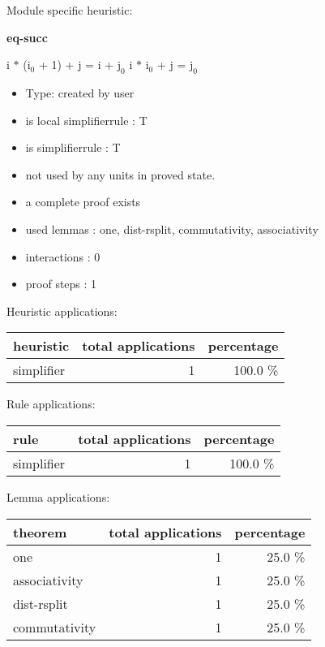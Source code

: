 \documentclass[a4paper]{article}
\begin{document}
Module specific heuristic:

\pagebreak

{\LARGE\bf eq-succ}\label{lemma-eq-succ}

\medskip

 \Fol i $*$ ($\mbox{i}_{0}$ + 1) + j = i + $\mbox{j}_{0}$ \Equiv i $*$ $\mbox{i}_{0}$ + j = $\mbox{j}_{0}$

\begin{itemize}

\item Type: created by user

\item is local simplifierrule : T
\item is simplifierrule : T
\item not used by any units in proved state.
\item       a complete proof exists
\item       used lemmas  : one, dist-rsplit, commutativity, associativity
\item       interactions : 0
\item       proof steps  : 1
\end{itemize}

\medskip


Heuristic applications:

\begin{supertabular}{l|r|r}
heuristic	& total applications & percentage \\ \hline
simplifier & 1 & 100.0 \% \\

\end{supertabular}

Rule applications:

\begin{supertabular}{l|r|r}
rule	        & total applications & percentage \\ \hline
simplifier & 1 & 100.0 \% \\

\end{supertabular}

Lemma applications:

\begin{supertabular}{l|r|r}
theorem	        & total applications & percentage \\ \hline
one & 1 & 25.0 \% \\
associativity & 1 & 25.0 \% \\
dist-rsplit & 1 & 25.0 \% \\
commutativity & 1 & 25.0 \% \\

\end{supertabular}
\end{document}

